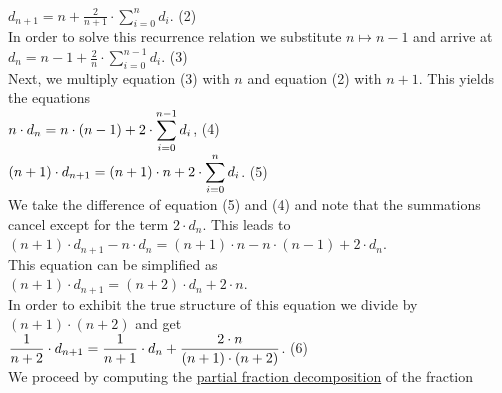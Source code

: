 \\[0.2cm]
\hspace*{1.3cm}
$\displaystyle d_{n+1} = n + \frac{2}{n+1} \cdot \sum\limits_{i=0}^n d_i$. \hspace*{\fill} (2)
\\[0.2cm] 
In order to solve this recurrence relation we substitute $n \mapsto n-1$ and arrive at
\\[0.2cm]
\hspace*{1.3cm}
$\displaystyle d_{n} = n-1 + \frac{2}{n} \cdot \sum\limits_{i=0}^{n-1} d_i$.  \hspace*{\fill} (3)
\\[0.2cm]
Next, we multiply equation (3) with $n$ and equation (2) with $n+1$.  This yields the equations
\\[0.2cm]
\hspace*{1.3cm}
$\displaystyle n \cdot d_{n} = n\cdot(n-1) + 2 \cdot \sum\limits_{i=0}^{n-1} d_i$,            \hspace*{\fill}
(4) 
\\[0.2cm]
\hspace*{1.3cm}
$\displaystyle (n+1)\cdot d_{n+1}  =  (n+1)\cdot n + 2 \cdot \sum\limits_{i=0}^n d_i$.   \hspace*{\fill} (5) 
\\[0.2cm]
We take the difference of  equation (5) and (4) and note that the summations cancel except for
the term $2\cdot d_{n}$.  This leads to
\\[0.2cm]
\hspace*{1.3cm}
$(n+1)\cdot d_{n+1} - n \cdot \displaystyle d_{n} = (n+1)\cdot n - n \cdot (n-1) + 2 \cdot d_{n}$.
\\[0.2cm] 
This equation can be simplified as
\\[0.2cm]
\hspace*{1.3cm}
$(n+1)\cdot d_{n+1} = (n+2) \cdot \displaystyle d_{n} + 2 \cdot n$.
\\[0.2cm] 
In order to exhibit the true structure of this equation we divide by $(n+1) \cdot(n+2)$ and
get 
\\[0.2cm]
\hspace*{1.3cm}
$\displaystyle\frac{1}{n+2} \cdot d_{n+1} = \frac{1}{n+1}\cdot d_{n} + \frac{2\cdot n}{(n+1)\cdot(n+2)}$. \hspace*{\fill} (6) 
\\[0.2cm]
We proceed by computing the 
\href{http://en.wikipedia.org/wiki/Partial_fraction}{partial fraction decomposition}
of the fraction
\\[0.2cm]
\hspace*{1.3cm}
